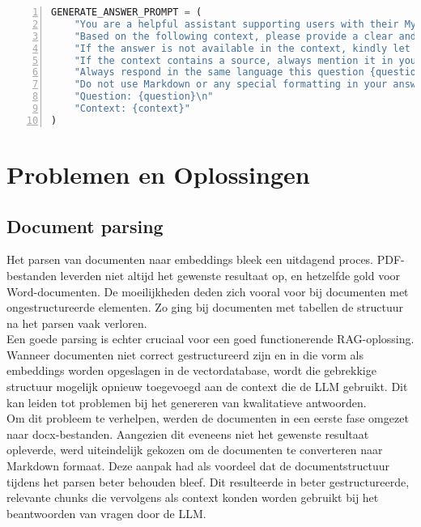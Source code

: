 \begin{lstlisting}[basicstyle=\small, frame=single, breaklines=true, postbreak=\mbox{\textcolor{red}{$\hookrightarrow$}\space}, escapeinside ={\%,}, escapechar={!}, numbers=left, language=Python, caption=Beoordeling documenten prompt]
GENERATE_ANSWER_PROMPT = (
    "You are a helpful assistant supporting users with their MyMinfin IT-related questions.\n"
    "Based on the following context, please provide a clear and complete answer.\n"
    "If the answer is not available in the context, kindly let the user know that you don't have enough information.\n"
    "If the context contains a source, always mention it in your answer as the reference.\n"
    "Always respond in the same language this question {question} is asked, even if the context is in a different language.\n"
    "Do not use Markdown or any special formatting in your answer, respond in plain text only.\n\n"
    "Question: {question}\n"
    "Context: {context}"
)
\end{lstlisting}

\section{Problemen en Oplossingen}

\subsection{Document parsing}
Het parsen van documenten naar embeddings bleek een uitdagend proces. PDF-bestanden leverden niet altijd het gewenste resultaat op, en hetzelfde gold voor Word-documenten. De moeilijkheden deden zich vooral voor bij documenten met ongestructureerde elementen. Zo ging bij documenten met tabellen de structuur na het parsen vaak verloren.
\\[1em]
Een goede parsing is echter cruciaal voor een goed functionerende RAG-oplossing. Wanneer documenten niet correct gestructureerd zijn en in die vorm als embeddings worden opgeslagen in de vectordatabase, wordt die gebrekkige structuur mogelijk opnieuw toegevoegd aan de context die de LLM gebruikt. Dit kan leiden tot problemen bij het genereren van kwalitatieve antwoorden.
\\[1em]
Om dit probleem te verhelpen, werden de documenten in een eerste fase omgezet naar docx-bestanden. Aangezien dit eveneens niet het gewenste resultaat opleverde, werd uiteindelijk gekozen om de documenten te converteren naar Markdown formaat. Deze aanpak had als voordeel dat de documentstructuur tijdens het parsen beter behouden bleef. Dit resulteerde in beter gestructureerde, relevante chunks die vervolgens als context konden worden gebruikt bij het beantwoorden van vragen door de LLM.

